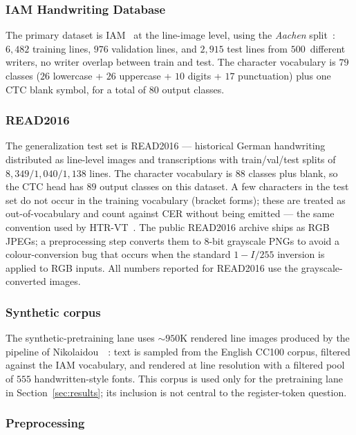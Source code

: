 \subsubsection{IAM Handwriting Database}

The primary dataset is IAM~\cite{marti2002iam} at the line-image level, using the \emph{Aachen} split~\cite{retsinas2022htrbestpractices}: $6{,}482$ training lines, $976$ validation lines, and $2{,}915$ test lines from $500$~different writers, no writer overlap between train and test. The character vocabulary is $79$ classes ($26$ lowercase + $26$ uppercase + $10$ digits + $17$ punctuation) plus one CTC blank symbol, for a total of $80$ output classes.

\subsubsection{READ2016}

The generalization test set is READ2016 --- historical German handwriting distributed as line-level images and transcriptions with train/val/test splits of $8{,}349/1{,}040/1{,}138$ lines. The character vocabulary is $88$ classes plus blank, so the CTC head has $89$ output classes on this dataset. A few characters in the test set do not occur in the training vocabulary (bracket forms); these are treated as out-of-vocabulary and count against CER without being emitted --- the same convention used by HTR-VT~\cite{li2024htrvt}. The public READ2016 archive ships as RGB JPEGs; a preprocessing step converts them to 8-bit grayscale PNGs to avoid a colour-conversion bug that occurs when the standard $1 - I/255$ inversion is applied to RGB inputs. All numbers reported for READ2016 use the grayscale-converted images.

\subsubsection{Synthetic corpus}

The synthetic-pretraining lane uses ${\sim}950$K rendered line images produced by the pipeline of Nikolaidou~\etal~\cite{nikolaidou2023wordstylist}: text is sampled from the English CC100 corpus, filtered against the IAM vocabulary, and rendered at line resolution with a filtered pool of $555$ handwritten-style fonts. This corpus is used only for the pretraining lane in Section~\ref{sec:results}; its inclusion is not central to the register-token question.

\subsubsection{Preprocessing}

